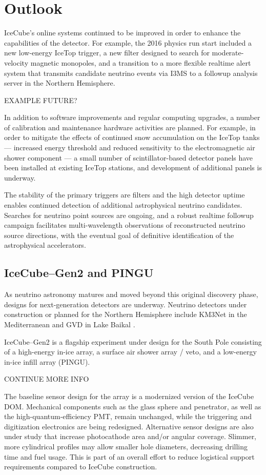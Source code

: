 \section{Outlook}

IceCube's online systems continued to be improved in order to enhance the
capabilities of the detector.  For example, the 2016 physics run start
included a new low-energy IceTop trigger, a new filter designed to search for
moderate-velocity magnetic monopoles, and a transition to a more flexible
realtime alert system that transmits candidate neutrino events via I3MS to a
followup analysis server in the Northern Hemisphere.

EXAMPLE FUTURE?

In addition to software improvements and regular computing upgrades, a
number of calibration and maintenance hardware activities are 
planned. For example, in order to mitigate the effects of continued snow
accumulation on the IceTop tanks --- increased energy threshold and reduced
sensitivity to the electromagnetic air shower component --- a small number
of scintillator-based  detector panels have been installed at existing
IceTop stations, and development of additional panels is underway.

The stability of the primary triggers are filters and the high detector
uptime enables continued detection of additional astrophysical neutrino
candidates.  Searches for neutrino point sources are ongoing, and a robust
realtime followup campaign facilitates multi-wavelength observations of
reconstructed neutrino source directions, with the eventual goal of
definitive identification of the astrophysical accelerators.

\subsection{IceCube--Gen2 and PINGU}

As neutrino astronomy matures and moved beyond this original discovery phase, designs
for next-generation detectors are underway.  Neutrino detectors under construction
or planned for the Northern Hemisphere include KM3Net in the Mediterranean
\cite{km3net} and GVD in Lake Baikal \cite{gvd}.  

IceCube--Gen2 is a flagship experiment under design for the South Pole
\cite{gen2_whitepaper} consisting of a high-energy in-ice array, a surface air
shower array / veto, and a low-energy in-ice infill array (PINGU).  

CONTINUE MORE INFO

The baseline sensor design for the array is a modernized version of the
IceCube DOM.  Mechanical components such as the glass sphere and
penetrator, as well as the high-quantum-efficiency PMT, remain unchanged,
while the triggering and digitization electronics are being redesigned.
Alternative sensor designs are also under study that increase photocathode
area and/or angular coverage.  Slimmer, more cylindrical profiles may
allow smaller hole diameters, decreasing drilling time and fuel usage.  This
is part of an overall effort to reduce logistical support requirements
compared to IceCube construction.  



